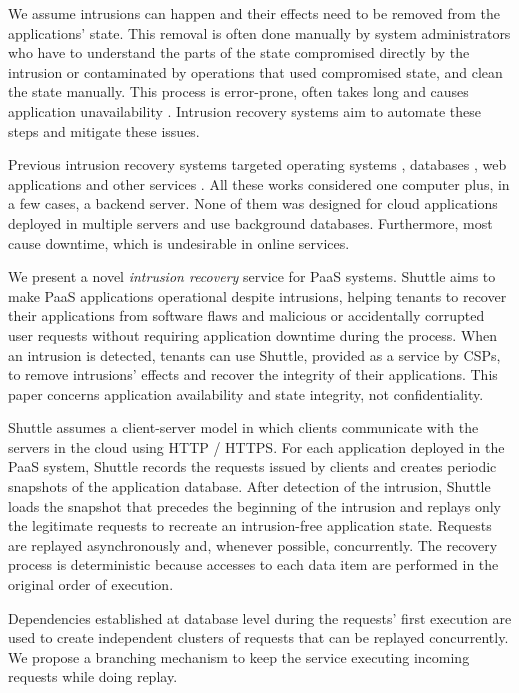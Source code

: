We  assume intrusions can happen and their effects need to be removed from the applications' state. This removal is often done manually by system administrators who have to understand the parts of the state compromised directly by the intrusion or contaminated by operations that used compromised state, and clean the state manually. This process is error-prone, often takes long and causes application unavailability \cite{Brown2001}. Intrusion recovery systems aim to automate these steps and mitigate these issues.

Previous intrusion recovery systems targeted operating systems \cite{taser,retro,dare}, databases \cite{itdb,phoenix}, web applications \cite{goel,warp,aire} and other services \cite{undoForOperators}. All these works considered one computer plus, in a few cases, a backend server. None of them was designed for cloud applications deployed in multiple servers and use background databases. Furthermore, most cause downtime, which is undesirable in online services.

We present a novel \emph{intrusion recovery} service for \ac{PaaS} systems. Shuttle aims to make \ac{PaaS} applications operational despite intrusions, helping tenants to recover their applications from software flaws and malicious or accidentally corrupted user requests without requiring application downtime during the process. When an intrusion is detected, tenants can use Shuttle, provided as a service by CSPs, to remove intrusions' effects and recover the integrity of their applications. This paper concerns application availability and state integrity, not confidentiality.

Shuttle assumes a client-server model in which clients communicate with the servers in the cloud using HTTP / HTTPS. For each application deployed in the \ac{PaaS} system, Shuttle records the requests issued by clients and creates periodic snapshots of the application database. 
After detection of the intrusion, Shuttle loads the snapshot that precedes the beginning of the intrusion and replays only the legitimate requests to recreate an intrusion-free application state. Requests are replayed asynchronously and, whenever possible, concurrently. The recovery process is deterministic because accesses to each data item are performed in the original order of execution.

Dependencies established at database level during the requests' first execution are used to create independent clusters of requests that can be replayed concurrently. We propose a branching mechanism to keep the service executing incoming requests while doing replay.

